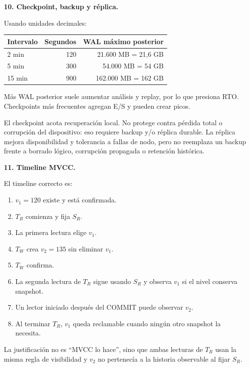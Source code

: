 \documentclass[variant=guiaresuelta,cover=institutional,mode=screen]{ua-engineering-v6-article}
\begin{document}
\begin{uaexercise}
\textbf{10. Checkpoint, backup y réplica.}
\end{uaexercise}
\begin{uaanswer}
Usando unidades decimales:

\begin{center}
\begin{tabular}{lrr}
\toprule
Intervalo & Segundos & WAL máximo posterior \\
\midrule
2 min & 120 & 21.600 MB = 21,6 GB \\
5 min & 300 & 54.000 MB = 54 GB \\
15 min & 900 & 162.000 MB = 162 GB \\
\bottomrule
\end{tabular}
\end{center}

Más WAL posterior suele aumentar análisis y replay, por lo que presiona RTO. Checkpoints más frecuentes agregan E/S y pueden crear picos.

El checkpoint acota recuperación local. No protege contra pérdida total o corrupción del dispositivo: eso requiere backup y/o réplica durable. La réplica mejora disponibilidad y tolerancia a fallas de nodo, pero no reemplaza un backup frente a borrado lógico, corrupción propagada o retención histórica.
\end{uaanswer}

\begin{uaexercise}
\textbf{11. Timeline MVCC.}
\end{uaexercise}
\begin{uaanswer}
El timeline correcto es:

\begin{enumerate}
\item $v_1=120$ existe y está confirmada.
\item $T_R$ comienza y fija $S_R$.
\item La primera lectura elige $v_1$.
\item $T_W$ crea $v_2=135$ sin eliminar $v_1$.
\item $T_W$ confirma.
\item La segunda lectura de $T_R$ sigue usando $S_R$ y observa $v_1$ si el nivel conserva snapshot.
\item Un lector iniciado después del COMMIT puede observar $v_2$.
\item Al terminar $T_R$, $v_1$ queda reclamable cuando ningún otro snapshot la necesita.
\end{enumerate}

La justificación no es ``MVCC lo hace'', sino que ambas lecturas de $T_R$ usan la misma regla de visibilidad y $v_2$ no pertenecía a la historia observable al fijar $S_R$.
\end{uaanswer}
\end{document}
